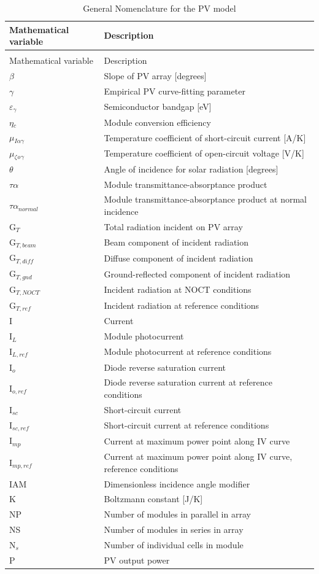 \begin{longtable}[l]{p{1.2in}p{4.8in}}
\caption{General Nomenclature for the PV model \label{table:general-nomenclature-for-the-pv-model}} \tabularnewline
\toprule 
Mathematical variable & Description \tabularnewline
\midrule
\endfirsthead

\caption[]{General Nomenclature for the PV model} \tabularnewline
\toprule 
Mathematical variable & Description \tabularnewline
\midrule
\endhead

$\beta$ & Slope of PV array [degrees] \tabularnewline
$\gamma$ & Empirical PV curve-fitting parameter \tabularnewline
$\varepsilon$\(_{\gamma}\) & Semiconductor bandgap [eV] \tabularnewline
$\eta$\(_{c}\) & Module conversion efficiency \tabularnewline
$\mu$\(_{I\alpha\gamma}\) & Temperature coefficient of short-circuit current [A/K] \tabularnewline
$\mu$\(_{\zeta}\)\(_o\)\(_{\gamma}\) & Temperature coefficient of open-circuit voltage [V/K] \tabularnewline
$\theta$ & Angle of incidence for solar radiation [degrees] \tabularnewline
$\tau\alpha$ & Module transmittance-absorptance product \tabularnewline
$\tau\alpha$\(_{normal}\) & Module transmittance-absorptance product at normal incidence \tabularnewline
G\(_{T}\) & Total radiation incident on PV array \tabularnewline
G\(_{T,beam}\) & Beam component of incident radiation \tabularnewline
G\(_{T,diff}\) & Diffuse component of incident radiation \tabularnewline
G\(_{T,gnd}\) & Ground-reflected component of incident radiation \tabularnewline
G\(_{T,NOCT}\) & Incident radiation at NOCT conditions \tabularnewline
G\(_{T,ref}\) & Incident radiation at reference conditions \tabularnewline
I & Current \tabularnewline
I\(_{L}\) & Module photocurrent \tabularnewline
I\(_{L,ref}\) & Module photocurrent at reference conditions \tabularnewline
I\(_{o}\) & Diode reverse saturation current \tabularnewline
I\(_{o,ref}\) & Diode reverse saturation current at reference conditions \tabularnewline
I\(_{sc}\) & Short-circuit current \tabularnewline
I\(_{sc,ref}\) & Short-circuit current at reference conditions \tabularnewline
I\(_{mp}\) & Current at maximum power point along IV curve \tabularnewline
I\(_{mp,ref}\) & Current at maximum power point along IV curve, reference conditions \tabularnewline
IAM & Dimensionless incidence angle modifier \tabularnewline
K & Boltzmann constant [J/K] \tabularnewline
NP & Number of modules in parallel in array \tabularnewline
NS & Number of modules in series in array \tabularnewline
N\(_{s}\) & Number of individual cells in module \tabularnewline
P & PV output power \tabularnewline

\end{longtable}
